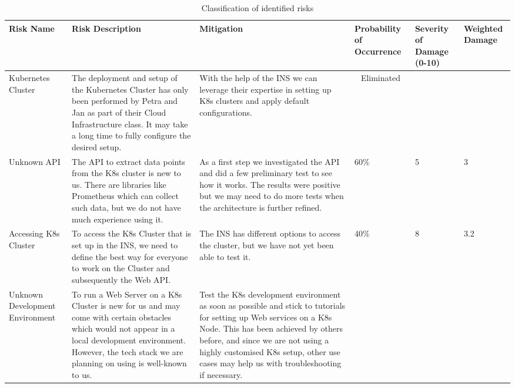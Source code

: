 \begin{longtable}[h!]{p{2.2cm} | p{4cm} | p{4cm} | p{1.5cm} | p{1.5cm} | p{1.5cm}}
    \caption{\label{tab:risk-classification}Classification of identified risks} \\
    \endfirsthead
    \textbf{Risk Name} & \textbf{Risk Description} & \textbf{Mitigation} & \textbf{Probability of Occurrence} & \textbf{Severity of Damage (0-10)} & \textbf{Weighted Damage} \\ \hline
    \endhead
        Kubernetes Cluster
            & The deployment and setup of the Kubernetes Cluster has only been performed by Petra and Jan as part of their Cloud Infrastructure class. It may take a long time to fully configure the desired setup.
            & With the help of the INS we can leverage their expertise in setting up K8s clusters and apply default configurations.
            & \multicolumn{1}{c}{Eliminated} \\ \hline
        Unknown API 
            & The API to extract data points from the K8s cluster is new to us. There are libraries like Prometheus which can collect such data, but we do not have much experience using it.
            & As a first step we investigated the API and did a few preliminary test to see how it works. The results were positive but we may need to do more tests when the architecture is further refined.
            & 60\% & 5 & 3 \\ \hline
        Accessing K8s Cluster 
            & To access the K8s Cluster that is set up in the INS, we need to define the best way for everyone to work on the Cluster and subsequently the Web API.
            & The INS has different options to access the cluster, but we have not yet been able to test it.
            & 40\% & 8 & 3.2 \\ \hline
        Unknown Development Environment
            & To run a Web Server on a K8s Cluster is new for us and may come with certain obstacles which would not appear in a local development environment. However, the tech stack we are planning on using is well-known to us.
            & Test the K8s development environment as soon as possible and stick to tutorials for setting up Web services on a K8s Node. This has been achieved by others before, and since we are not using a highly customised K8s setup, other use cases may help us with troubleshooting if necessary.

\end{longtable}
